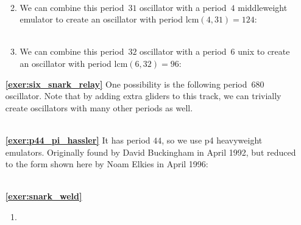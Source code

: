 \begin{multicols}{2}
\begin{itemize}[leftmargin=0em]
\begin{enumerate}[leftmargin=1.5em,label=\bf\color{ocre}(\alph*)]
			 \\
			
			\item We can combine this period~$31$ oscillator with a period~$4$ middleweight emulator to create an oscillator with period $\mathrm{lcm}(4,31) = 124$:  \\[-0.6em]
			
			 \\
			
			\item We can combine this period~$32$ oscillator with a period~$6$ unix to create an oscillator with period $\mathrm{lcm}(6,32) = 96$: \\[-0.6em]
			
		\end{enumerate}
		
		
		\item[\bf\color{ocre}\sffamily\ref{exer:six_snark_relay}] One possibility is the following period~$680$ oscillator. Note that by adding extra gliders to this track, we can trivially create oscillators with many other periods as well. \\[-0.6em]
		
		 \\
		
		
		\item[\bf\color{ocre}\sffamily\ref{exer:p44_pi_hassler}] It has period $44$, so we use p4 heavyweight emulators. Originally found by David Buckingham in April 1992, but reduced to the form shown here by Noam Elkies in April 1996:\\[-0.6em]
		
		 \\
		
		
		\item[\bf\color{ocre}\sffamily\ref{exer:snark_weld}]
		\begin{enumerate}[leftmargin=1.5em,label=\bf\color{ocre}(\alph*)]
			\item {}
			

\end{enumerate}
\end{itemize}
\end{multicols}
